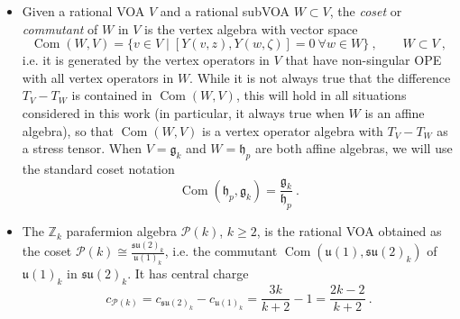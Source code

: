 \documentclass[11pt,reqno]{article}
\newcommand{\be}{\begin{equation}}
\newcommand{\ee}{\end{equation}}
\DeclareMathOperator{\Tr}{Tr}
\DeclareMathOperator{\Com}{Com}
\newcommand{\ZZ}{\mathbb{Z}}
\newcommand{\paraf}{\mathcal{P}}
\newcommand{\alg}[1]{\mathfrak{#1}}
\DeclareMathOperator{\ch}{ch}
\begin{document}
\begin{itemize}
	\be c=\frac{3k}{k+2}\ .
	\ee
	 The modules $L_{\alg{su}(2)}(k,\ell)$ are labeled by $\ell\in \{0,\ldots k\}$, have conformal weight $\frac{\ell(\ell+2)}{4(k+2)}$, and the characters are given by 
	\be\label{su2Nchar} \ch_\ell^{\alg{su}(2)_k}(\tau,z):=\Tr_{L_{\alg{su}(2)}(k,\ell)}(q^{L_0-\frac{c}{24}}e^{2\pi i z j^3_0})=\frac{\Theta^{(k+2)}_{\ell+1}(\tau,z)-\Theta^{(k+2)}_{-\ell-1}(\tau,z)}{\Theta^{(2)}_{1}(\tau,z)-\Theta^{(2)}_{-1}(\tau,z)}\ .\ee Notice that for $\ell,\ell'\in\{0,\ldots, N-1\}$, one has
	\be\label{invertsu2N} \left[\ch_{\ell'}^{\alg{su}(2)_k}(\tau,z)\left( \Theta^{(2)}_{1}(\tau,z)-\Theta^{(2)}_{-1}(\tau,z)\right)\right]_{y^{\ell+1}}=\left[\Theta^{(k+2)}_{\ell'+1}(\tau,z)-\Theta^{(k+2)}_{-\ell'-1}(\tau,z)\right]_{y^{\ell+1}}=q^{\frac{(\ell+1)^2}{4k+8}}\delta_{\ell,\ell'}\ ,
	\ee where $\left[\ldots\right]_{y^{\ell+1}}$ means that we pick the coefficient of the $y^{\ell+1}:=e^{2\pi i z(\ell+1)}$ term.
	\item Given a rational VOA $V$ and a rational subVOA $W\subset V$, the \emph{coset} or \emph{commutant} of $W$ in $V$ is the vertex algebra with vector space
	\be \Com(W,V)=\{v\in V\mid [Y(v,z),Y(w,\zeta)]=0\ \forall w\in W\}\ ,\qquad W\subset V\ ,
	\ee i.e. it is generated by the vertex operators in $V$ that have non-singular OPE with all vertex operators in $W$. While it is not always true that the difference $T_V-T_W$ is contained in $\Com(W,V)$, this will hold in all situations considered in this work (in particular, it always true when $W$ is an affine algebra), so that  $\Com(W,V)$ is a vertex operator algebra with $T_V-T_W$ as a stress tensor. When $V=\alg{g}_k$ and $W=\alg{h}_p$ are both affine algebras, we will use the standard coset notation
	\be \Com(\alg{h}_p,\alg{g}_k)=\frac{\alg{g}_k}{\alg{h}_p}\ .
	\ee
	\item The $\ZZ_k$ parafermion algebra $\paraf(k)$, $k\ge 2$, is the rational VOA obtained as the coset $\paraf(k)\cong \frac{\alg{su}(2)_k}{\alg{u}(1)_k}$, i.e. the commutant $\Com(\alg{u}(1),\alg{su}(2)_k)$ of $\alg{u}(1)_k$ in $\alg{su}(2)_k$. It has central charge
	\be c_{\paraf(k)}=c_{\alg{su}(2)_k}-c_{\alg{u}(1)_k}=\frac{3k}{k+2}-1=\frac{2k-2}{k+2}\ .
	\ee

\end{itemize}
\end{document}
